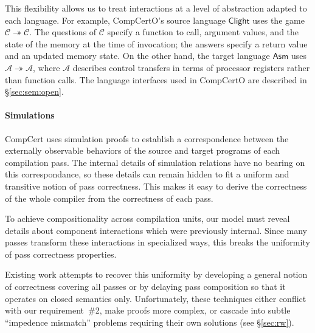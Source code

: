 \documentclass[draft,11pt]{report}
\newcommand{\kw}[1]{\ensuremath{ \mathsf{#1} }}
\begin{document}
This flexibility allows us to treat interactions
at a level of abstraction adapted to each language.
For example, CompCertO's source language \kw{Clight} uses the game
\mbox{$\mathcal{C} \twoheadrightarrow \mathcal{C}$}.
The questions of $\mathcal{C}$ specify a function to call,
argument values,
and the state of the memory at the time of invocation;
the answers specify a return value and an updated memory state.
On the other hand, the target language \kw{Asm} uses
$\mathcal{A} \twoheadrightarrow \mathcal{A}$,
where $\mathcal{A}$ describes control transfers
in terms of processor registers
rather than function calls.
The language interfaces used in CompCertO
are described in \S\ref{sec:sem:open}.



\paragraph{Simulations} %

CompCert uses simulation proofs
to establish a correspondence between
the externally observable behaviors of
the source and target programs of each compilation pass.
The internal details of simulation relations
have no bearing on this correspondance,
so these details can remain hidden
to fit a uniform and transitive notion of pass correctness.
This makes it easy to derive the correctness
of the whole compiler
from the correctness of each pass.

To achieve compositionality across compilation units,
our model must reveal details
about component interactions
which were previously internal.
Since many passes transform
these interactions in
specialized ways,
this breaks the uniformity
of pass correctness properties.

Existing work attempts to recover this uniformity
by developing a general notion of correctness
covering all passes
or by delaying pass composition so that
it operates on closed semantics only.
Unfortunately, these techniques either
conflict with our requirement~\#2,
make proofs more complex,
or cascade into subtle ``impedence mismatch'' problems
requiring their own solutions
(see \S\ref{sec:rw}).
\end{document}
